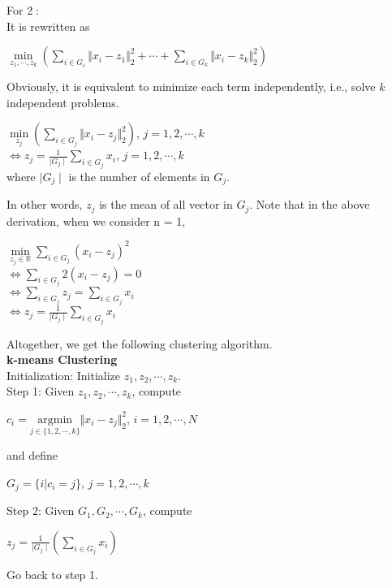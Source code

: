 \documentclass{article}
\begin{document}
For \textcircled{2}: \\
It is rewritten as 
\begin{center}
     $\underset{z_1, \cdots, z_k}{\min}(\sum_{i \in G_i}\Vert x_i - z_1 \Vert_{2}^{2} + \cdots + \sum_{i \in G_k}\Vert x_i - z_k\Vert_{2}^{2})$ \\
\end{center}
Obviously, it is equivalent to minimize each term independently, i.e., solve $k$ independent problems.
\begin{center}
    $\underset{z_j}{\min}(\sum_{i \in G_j} \Vert x_i - z_j \Vert_{2}^{2})$, $j = 1,2, \cdots, k$ \\
    $\iff z_j = \frac{1}{\mid{G_j}\mid} \sum_{i \in G_j} x_i$, $j = 1,2, \cdots, k$ \\
    where $\mid{G_j}\mid$ is the number of elements in $G_j$. 
\end{center}
In other words, $z_j$ is the mean of all vector in $G_j$.
Note that in the above derivation, when we consider n = 1,
\begin{center}
    $\underset{z_j \in \mathbb{R}}{\min} \sum_{i \in G_j} (x_i - z_j)^2$ \\
    $\iff \sum_{i \in G_j}2(x_i - z_j) = 0$ \\
    $\iff \sum_{i \in G_j} z_j = \sum_{i \in G_j} x_i$ \\
    $\iff z_j = \frac{1}{\mid{G_j}\mid} \sum_{i \in G_j} x_i$ 
    
    
\end{center}
Altogether, we get the following clustering algorithm. \\
\bigbreak
\textbf{k-means Clustering} \\
Initialization: Initialize $z_1, z_2, \cdots, z_k$. \\
Step 1: Given $z_1,z_2, \cdots, z_k$, compute
\begin{center}
    $c_i = \underset{j \in \{1,2,\cdots,k\}}{\text{argmin}}\Vert x_i - z_j \Vert_{2}^{2}$, $i = 1,2, \cdots, N$ 
\end{center}
and define 
\begin{center}
    $G_j = \{i|c_i = j\}$, $j = 1,2, \cdots, k$
\end{center}
Step 2: Given $G_1,G_2,\cdots,G_k$, compute
\begin{center}
    $z_j = \frac{1}{\mid{G_j}\mid} (\sum_{i \in G_j} x_i)$
\end{center}
Go back to step 1. 
\bigbreak
\end{document}
